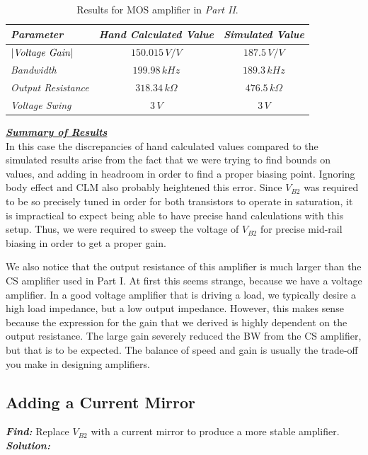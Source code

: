 \documentclass[12pt, fleqn]{article}
\begin{document}
\begin{table}[H]
\centering
\setlength{\tabcolsep}{20pt}
\renewcommand{\arraystretch}{1.5}
\begin{tabular}{|l|c|c|}
    \hline
    \textbf{\textit{Parameter}} & \textbf{\textit{Hand Calculated Value}} & \textbf{\textit{Simulated Value}}\\
    \hline
    $\left|\text{\textit{Voltage Gain}}\right|$ & $150.015\,V/V$ & $187.5\,V/V$\\
    \hline
    \textit{Bandwidth} & $199.98\,kHz$ & $189.3\,kHz$\\
    \hline
    \textit{Output Resistance} & $318.34\,k\Omega$ & $476.5\,k\Omega$\\
    \hline
    \textit{Voltage Swing} & $3\,V$ & $3\,V$\\
    \hline
\end{tabular}
\caption{Results for MOS amplifier in \textit{Part II}.}
\end{table}
\noindent
\underline{\textbf{\textit{Summary of Results}}}\\[0.25cm]
In this case the discrepancies of hand calculated values compared to the simulated results arise from the fact that we were trying to find bounds on values, and adding in headroom in order to find a proper biasing point.  Ignoring body effect and CLM also probably heightened this error.  Since $V_{B2}$ was required to be so precisely tuned in order for both transistors to operate in saturation, it is impractical to expect being able to have precise hand calculations with this setup.  Thus, we were required to sweep the voltage of $V_{B2}$ for precise mid-rail biasing in order to get a proper gain.

We also notice that the output resistance of this amplifier is much larger than the CS amplifier used in Part I.  At first this seems strange, because we have a voltage amplifier.  In a good voltage amplifier that is driving a load, we typically desire a high load impedance, but a low output impedance.  However, this makes sense because the expression for the gain that we derived is highly dependent on the output resistance.  The large gain severely reduced the BW from the CS amplifier, but that is to be expected.  The balance of speed and gain is usually the trade-off you make in designing amplifiers.
\newpage
\subsection{Adding a Current Mirror}
\textbf{\emph{Find: }} Replace $V_{B2}$ with a current mirror to produce a more stable amplifier.\\[0.25cm]
\noindent
\textbf{\emph{Solution: }}
\end{document}
